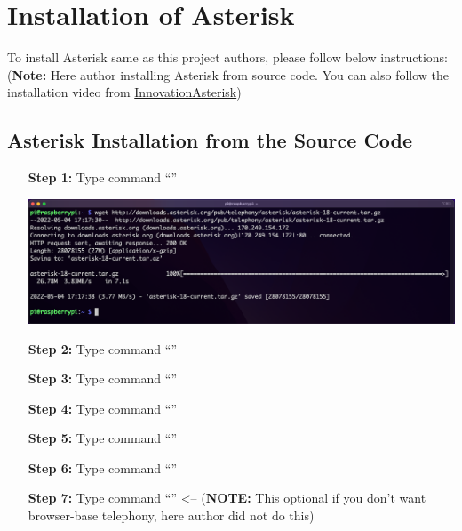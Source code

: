 \section{Installation of Asterisk}	\label{sec:run-asterisk}
	To install Asterisk same as this project authors, please follow below instructions: (\textbf{Note:} Here author installing Asterisk from source code. You can also follow the installation video from \href{https://www.youtube.com/watch?v=52sEPVPV9JE&list=PLruX0IBTg1G4Auvo5YhoJKgskmMP7b8bJ&index=4&ab_channel=InnovateAsterisk}{InnovationAsterisk})
	
	\subsection{Asterisk Installation from the Source Code}
		\begin{itemize}[leftmargin=1.7cm]
			\item[\textbf{Step 1:}] Type command ``{\selectfont{wget http://downloads.as\\terisk.org/pub/telephony/asterisk/aste\\risk-18-current.tar.gz}}''\\
				\begin{minipage}{\textwidth}
					\vspace{2mm}
					\includegraphics[scale=0.135]{Images/raspberry_pi/asterisk_install/wget.png}
					\vspace{2mm}
				\end{minipage}
			
			\item[\textbf{Step 2:}] Type command ``{\selectfont{sudo apt-get update}}''
			\item[\textbf{Step 3:}] Type command ``{\selectfont{sudo apt-get upgrade}}''
			\item[\textbf{Step 4:}] Type command ``{\selectfont{sudo apt-get install ntp}}''
			\item[\textbf{Step 5:}] Type command ``{\selectfont{sudo apt-get install spe\\ex speex* libspeex-dev libspeexdsp-dev\\}}''
			\item[\textbf{Step 6:}] Type command ``{\selectfont{sudo apt-get install lib\\speex-dev libspeexdsp-dev speex speex-\\doc}}''
			\item[\textbf{Step 7:}] Type command ``{\selectfont{sudo apt-get install xm\\lstarlet libopus-dev libopusfile-dev}}'' <-- (\textbf{NOTE:} This optional if you don't want browser-base telephony, here author did not do this)
			

\end{itemize}
